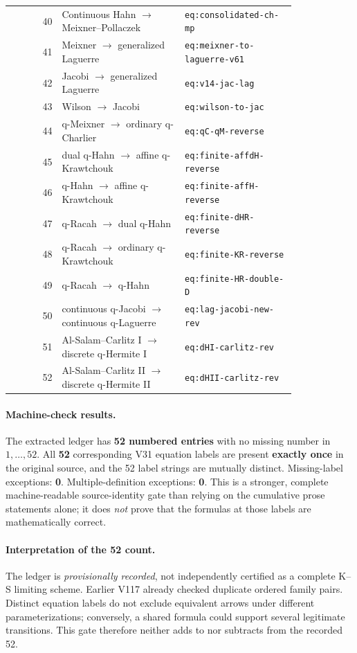 \documentclass[11pt]{article}
\begin{document}
\begin{center}
\begin{longtable}{@{}r p{0.43\linewidth} p{0.39\linewidth}@{}}
40 & Continuous Hahn $\to$ Meixner--Pollaczek & \texttt{eq:consolidated-ch-mp} \\
41 & Meixner $\to$ generalized Laguerre & \texttt{eq:meixner-to-laguerre-v61} \\
42 & Jacobi $\to$ generalized Laguerre & \texttt{eq:v14-jac-lag} \\
43 & Wilson $\to$ Jacobi & \texttt{eq:wilson-to-jac} \\
44 & q-Meixner $\to$ ordinary q-Charlier & \texttt{eq:qC-qM-reverse} \\
45 & dual q-Hahn $\to$ affine q-Krawtchouk & \texttt{eq:finite-affdH-reverse} \\
46 & q-Hahn $\to$ affine q-Krawtchouk & \texttt{eq:finite-affH-reverse} \\
47 & q-Racah $\to$ dual q-Hahn & \texttt{eq:finite-dHR-reverse} \\
48 & q-Racah $\to$ ordinary q-Krawtchouk & \texttt{eq:finite-KR-reverse} \\
49 & q-Racah $\to$ q-Hahn & \texttt{eq:finite-HR-double-D} \\
50 & continuous q-Jacobi $\to$ continuous q-Laguerre & \texttt{eq:lag-jacobi-new-rev} \\
51 & Al-Salam--Carlitz I $\to$ discrete q-Hermite I & \texttt{eq:dHI-carlitz-rev} \\
52 & Al-Salam--Carlitz II $\to$ discrete q-Hermite II & \texttt{eq:dHII-carlitz-rev} \\
\end{longtable}\end{center}
\paragraph{Machine-check results.} The extracted ledger has \textbf{52 numbered entries} with no missing number in $1,\ldots,52$. All \textbf{52} corresponding V31 equation labels are present \textbf{exactly once} in the original source, and the 52 label strings are mutually distinct. Missing-label exceptions: \textbf{0}. Multiple-definition exceptions: \textbf{0}. This is a stronger, complete machine-readable source-identity gate than relying on the cumulative prose statements alone; it does \emph{not} prove that the formulas at those labels are mathematically correct.

\paragraph{Interpretation of the 52 count.} The ledger is \emph{provisionally recorded}, not independently certified as a complete K--S limiting scheme. Earlier V117 already checked duplicate ordered family pairs. Distinct equation labels do not exclude equivalent arrows under different parameterizations; conversely, a shared formula could support several legitimate transitions. This gate therefore neither adds to nor subtracts from the recorded 52.
\end{document}
